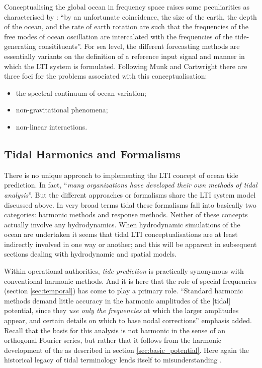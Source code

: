 Conceptualising the global ocean in frequency space raises some peculiarities as characterised by  \citet{Groves:1975ky}: ``by an unfortunate coincidence, the size of the earth, the depth of the ocean, and the rate of earth rotation are such that the frequencies of the free modes of ocean oscillation are intercalated with the frequencies of the tide-generating consitituents''.
For sea level, the different forecasting methods are essentially variants on the  definition of a reference input signal and manner in which the LTI system is formulated.   Following Munk and Cartwright \citep{Munk:1966ts} there are three foci for the problems associated with this conceptualisation:
\begin{itemize}
\item the spectral continuum of ocean variation;
\item non-gravitational phenomena; 
\item non-linear interactions.   
\end{itemize}

\subsection{Tidal Harmonics and Formalisms}
\label{sec:formalisms}
There is no unique approach to implementing the LTI concept of ocean tide prediction. In fact, ``\textit{many organizations have developed their own methods of tidal analysis}''\citep{IOC:2005tj}. But the different approaches or formalisms share the LTI system model discussed above.  
In very broad terms tidal these formalisms fall into basically two categories: harmonic methods and response methods.  
Neither of these concepts actually involve any hydrodynamics. When hydrodynamic simulations of the ocean are undertaken it seems that tidal LTI conceptualisations are at least indirectly involved in one way or another; and this will be apparent in subsequent sections dealing with hydrodynamic and spatial models. 

Within operational authorities, \emph{tide prediction} is practically synonymous with conventional harmonic methods. And it is here that the role of special frequencies (section \ref{sec:temporal}) has come to play a primary role.
``Standard harmonic methods demand little accuracy in the harmonic amplitudes of the [tidal] potential, since they \textit{use only the frequencies} at which the larger amplitudes appear, and certain details on which to base nodal corrections''\cite{Cartwright:1973em} emphasis added.
Recall that the basis for this analysis is not harmonic in the sense of an orthogonal Fourier series, but rather that it follows from the harmonic development of the \ATGP{} as described in section \ref{sec:basic_potential}.    Here again the historical legacy of tidal terminology lends itself to misunderstanding \citep{Cartwright:2000tt}\citep{Parker:2007wq}.


